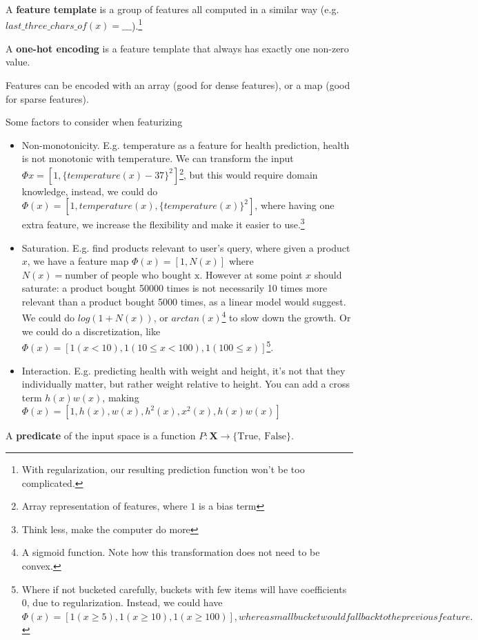 \documentclass{article}
\begin{document}
A \textbf{feature template} is a group of features all computed in a similar way (e.g. $last\_three\_chars\_of(x) = \_\_\_$).\footnote{With regularization, our resulting prediction function won't be too complicated.}

A \textbf{one-hot encoding} is a feature template that always has exactly one non-zero value.

Features can be encoded with an array (good for dense features), or a map (good for sparse features).

Some factors to consider when featurizing
\begin{itemize}
  \item Non-monotonicity. E.g. temperature as a feature for health prediction, health is not monotonic with temperature. We can transform the input $\Phi{x} = [1, \{temperature(x) - 37\}^2]$\footnote{Array representation of features, where $1$ is a bias term}, but this would require domain knowledge, instead, we could do $\Phi(x) = [1, temperature(x), \{temperature(x)\}^2]$, where having one extra feature, we increase the flexibility and make it easier to use.\footnote{Think less, make the computer do more}
  \item Saturation. E.g. find products relevant to user's query, where given a product $x$, we have a feature map $\Phi(x) = [1, N(x)]$ where $N(x) = \text{number of people who bought x}$. However at some point $x$ should saturate: a product bought 50000 times is not necessarily 10 times more relevant than a product bought 5000 times, as a linear model would suggest. We could do $log(1 + N(x))$, or $arctan(x)$\footnote{A sigmoid function. Note how this transformation does not need to be convex.} to slow down the growth. Or we could do a discretization, like $\Phi(x) = [1 (x < 10), 1 (10 \leq x < 100), 1 (100 \leq x)]$\footnote{Where if not bucketed carefully, buckets with few items will have coefficients $0$, due to regularization. Instead, we could have $\Phi(x) = [1 (x \geq 5), 1 (x \geq 10), 1 (x \geq 100)], where a small bucket would fall back to the previous feature.$}.
  \item Interaction. E.g. predicting health with weight and height, it's not that they individually matter, but rather weight relative to height. You can add a cross term $h(x)w(x)$, making $\Phi(x) = [1, h(x), w(x), h^2(x), x^2(x), h(x)w(x)]$
\end{itemize}

A \textbf{predicate} of the input space is a function $P : \mathbf{X} \to \{\text{True},~\text{False}\}$.
\end{document}
